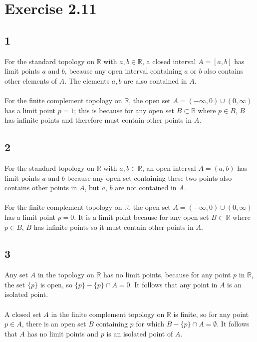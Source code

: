 \documentclass{article}
\begin{document}
\section*{Exercise 2.11}

\subsection*{1}

For the standard topology on $\mathbb{R}$ with $a, b \in \mathbb{R}$, a closed interval $A = [a, b ]$ has limit points 
$a$ and $b$, because any open interval containing $a$ or $b$ also contains other elements of $A$.  The elements $a, b$ are also 
contained in $A$.\\ 
\\ 
For the finite complement topology on $\mathbb{R}$, the open set $A = (-\infty, 0 ) \cup ( 0, \infty )$ has a limit point $p = 1$; 
this is because for any open set $B \subset \mathbb{R}$ where $p \in B$, $B$ has infinite points and therefore must contain other points in $A$.

\newpage 

\subsection*{2}
For the standard topology on $\mathbb{R}$ with $a, b \in \mathbb{R}$, an open interval $A = (a, b)$ has limit points $a$ and $b$ because any 
open set containing these two points also contains other points in $A$, but $a$, $b$ are not contained in $A$.\\ 
\\ 
For the finite complement topology on $\mathbb{R}$, the open set $A = (-\infty, 0) \cup (0, \infty)$ has a limit point $p = 0$.  It is 
a limit point because for any open set $B \subset \mathbb{R}$ where $p \in B$, $B$ has infinite points so it must contain other points in $A$.
 
\subsection*{3} 
Any set $A$ in the topology on $\mathbb{R}$ has no limit points, because for any point $p$ in $\mathbb{R}$, the set $\{ p \}$ is open, so $\{p\} - \{p\} \cap A = 0$. 
It follows that any point in $A$ is an isolated point.  \\ 
\\ 
A closed set $A$ in the finite complement topology on $\mathbb{R}$ is finite, so for any point $p \in A$, there is an open set $B$ containing 
$p$ for which $B - \{p\} \cap A = \emptyset$.  It follows that $A$ has no limit points 
and $p$ is an isolated point of $A$.
\end{document}
